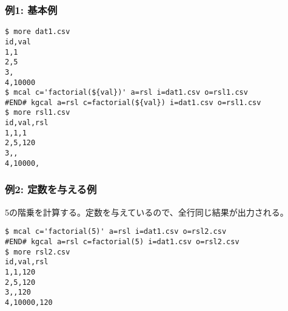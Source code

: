 \subsubsection*{例1: 基本例}



\begin{Verbatim}[baselinestretch=0.7,frame=single]
$ more dat1.csv
id,val
1,1
2,5
3,
4,10000
$ mcal c='factorial(${val})' a=rsl i=dat1.csv o=rsl1.csv
#END# kgcal a=rsl c=factorial(${val}) i=dat1.csv o=rsl1.csv
$ more rsl1.csv
id,val,rsl
1,1,1
2,5,120
3,,
4,10000,
\end{Verbatim}
\subsubsection*{例2: 定数を与える例}

5の階乗を計算する。定数を与えているので、全行同じ結果が出力される。


\begin{Verbatim}[baselinestretch=0.7,frame=single]
$ mcal c='factorial(5)' a=rsl i=dat1.csv o=rsl2.csv
#END# kgcal a=rsl c=factorial(5) i=dat1.csv o=rsl2.csv
$ more rsl2.csv
id,val,rsl
1,1,120
2,5,120
3,,120
4,10000,120
\end{Verbatim}
